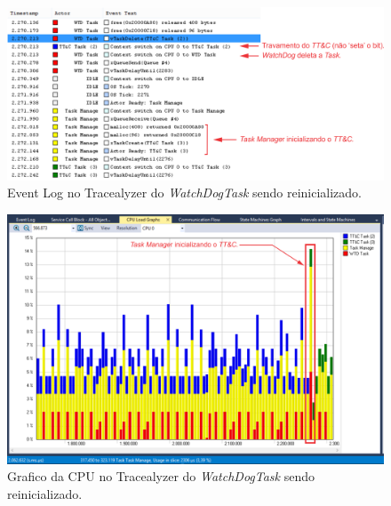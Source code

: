 \begin{figure}[h]
	\centering

	\includegraphics[keepaspectratio=true,scale=0.63]{figuras/watchDogFreeRTOS_3.PNG}
	\caption{Event Log no Tracealyzer do \textit{WatchDogTask} sendo reinicializado.}	
	\label{watchDogFreeRTOS_1}
\end{figure}
\FloatBarrier


\begin{figure}[h]
	\centering

	\includegraphics[keepaspectratio=true,scale=0.65]{figuras/watchDogFreeRTOS_description.PNG}
	\caption{Grafico da CPU no Tracealyzer do \textit{WatchDogTask} sendo reinicializado.}	
	\label{watchDogFreeRTOS}
\end{figure}


